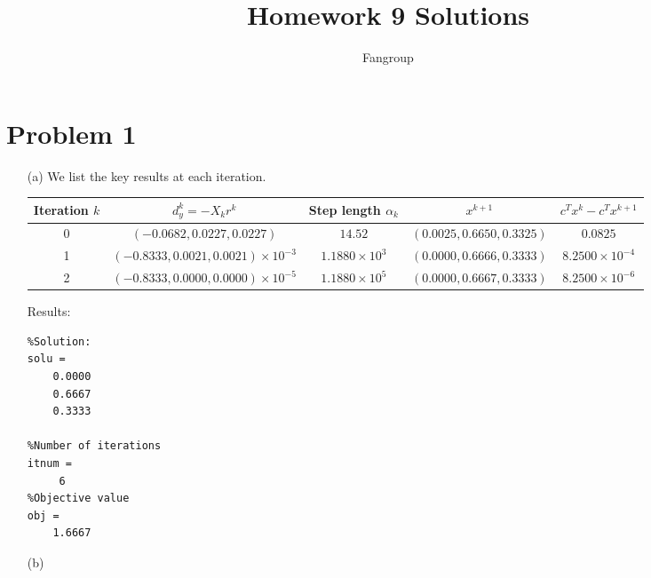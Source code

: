 \documentclass[12pt]{article}
\begin{document}
 
 
\title{Homework 9 Solutions}
\author{Fangroup}
\maketitle

\section*{Problem 1}

\begin{enumerate}
\item [(a)]
We list the key results at each iteration.
\begin{table}[h]
\small
\centering
    \begin{tabular}{|c|c|c|c|c|}
      \hline
      Iteration $k$ & $d_y^k=-X_kr^k$ & Step length $\alpha_k$ & $x^{k+1}$ & $c^Tx^k - c^Tx^{k+1}$ \\\hline
      0 & $(-0.0682,0.0227,0.0227)$ & $14.52$ & $(0.0025,0.6650,0.3325)$ & $0.0825$ \\\hline
      1 & $(-0.8333,0.0021,0.0021)\times 10^{-3}$ & $1.1880\times 10^3$ & $(0.0000,0.6666,0.3333)$ & $8.2500\times 10^{-4}$ \\\hline
      2 & $(-0.8333,0.0000,0.0000)\times 10^{-5}$ & $1.1880\times 10^5$ & $(0.0000,0.6667,0.3333)$ & $8.2500\times 10^{-6}$ \\\hline
    \end{tabular}
\end{table}

Results:

\begin{lstlisting}
%Solution:
solu =
    0.0000
    0.6667
    0.3333

%Number of iterations
itnum =
     6
%Objective value
obj =
    1.6667

\end{lstlisting}

\item [(b)]


\end{enumerate}
\end{document}

